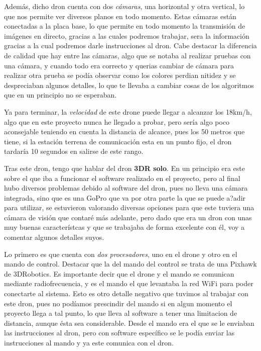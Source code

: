 \documentclass{report}
\begin{document}
\hspace{1 cm} Adem\'as, dicho dron cuenta con dos \textsl{c\'amaras}, una horizontal y otra vertical, lo que nos permite ver diversos planos en todo momento. Estas c\'amaras est\'an conectadas a la placa base, lo que permite en todo momento la transmisi\'on de im\'agenes en directo, gracias a las cuales podremos trabajar, sera la informaci\'on gracias a la cual podremos darle instrucciones al dron. Cabe destacar la diferencia de calidad que hay entre las c\'amaras, algo que se notaba al realizar pruebas con una c\'amara, y cuando todo era correcto y querias cambiar de c\'amara para realizar otra prueba se pod\'ia observar como los colores perdian nitidez y se despreciaban algunos detalles, lo que te llevaba a cambiar cosas de los algoritmos que en un principio no se esperaban. 

\hspace{1 cm} Ya para terminar, la \textsl{velocidad} de este drone puede llegar a alcanzar los 18km/h, algo que en este proyecto nunca he llegado a probar, pero ser\'ia algo poco aconsejable teniendo en cuenta la distancia de alcance, pues los 50 metros que tiene, si la estaci\'on terrena de comunicaci\'on esta en un punto fijo, el dron tardar\'ia 10 segundos en salirse de este rango. 


\hspace{1 cm} Tras este dron, tengo que hablar del dron \textbf{3DR solo}. En un principio era este sobre el que iba a funcionar el software realizado en el proyecto, pero al final hubo diversos problemas debido al software del dron, pues no lleva una c\'amara integrada, sino que es una GoPro que va por otra parte la que se puede a?adir para utilizar, se estuvieron valorando diversas opciones para que este tuviera una c\'amara de visi\'on que contar\'e m\'as adelante, pero dado que era un dron con unas muy buenas caracter\'istcas y que se trabajaba de forma excelente con \'el, voy a comentar algunos detalles suyos. 

\hspace{1 cm} Lo primero es que cuenta con \textsl{dos procesadores}, uno en el drone y otro en el mando de control. Destacar que la del mando del control se trata de una Pixhawk de 3DRobotics. Es importante decir que el drone y el mando se comunican mediante radiofrecuencia, y es el mando el que levantaba la red WiFi para poder conectarte al sistema. Esto es otro detalle negativo que tuvimos al trabajar con este dron, pues no pod\'iamos prescindir del mando si en algun momento el proyecto llega a tal punto, lo que lleva al software a tener una limitacion de distancia, aunque \'esta sea considerable. Desde el mando era el que se le enviaban las instrucciones al dron, pero con software espec\'ifico se le pod\'ia enviar las instrucciones al mando y ya este comunica con el dron. 
\end{document}
